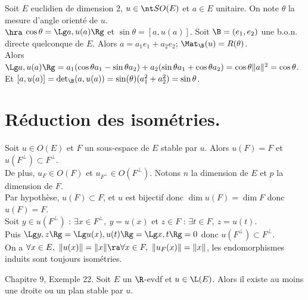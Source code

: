 \documentclass[11pt]{article}
\begin{document}
\begin{ex}{}{}
    Soit $E$ euclidien de dimension 2, $u\in\SO(E)$ et $a\in E$ unitaire. On note $\theta$ la mesure d'angle orienté de $u$.\\
    $\hra$ $\cos\theta=\Lg a, u(a) \Rg$ et $\sin\theta=[a, u(a)]$.
    \tcblower
    Soit $\B=(e_1,e_2)$ une b.o.n. directe quelconque de $E$. Alors $a=a_1e_1+a_2e_2$; $\Mat_\B(u)=R(\theta)$.\\
    Alors $\Lg a, u(a) \Rg  = a_1(\cos\theta a_1 - \sin\theta a_2) + a_2(\sin\theta a_1 + \cos\theta a_2) = \cos\theta\|a\|^2=\cos\theta$.\\
    Et $[a,u(a)]=\det_\B(a,u(a))=\sin(\theta)(a_1^2+a_2^2)=\sin\theta$.
\end{ex}

\section{Réduction des isométries.}

\begin{prop}{}{}
    Soit $u\in O(E)$ et $F$ un sous-espace de $E$ stable par $u$. Alors $u(F) = F$ et $u(F^\bot)\subset F^\bot$.\\
    De plus, $u_F\in O(F)$ et $u_{F^\bot}\in O(F^\bot)$.
    \tcblower
    Notons $n$ la dimension de $E$ et $p$ la dimension de $F$.\\
    Par hypothèse, $u(F)\subset F$, et $u$ est bijectif donc $\dim u(F) = \dim F$ donc $u(F)=F$.\\
    Soit $y\in u(F^\bot)$ : $\exists x \in F^\bot, ~ y=u(x)$ et $z\in F$ : $\exists t \in F, ~ z=u(t)$.\\
    Puis $\Lg y, z \Rg = \Lg u(x), u(t) \Rg = \Lg x,t\Rg = 0$ donc $u(F^\bot)\subset F^\bot$.\\
    On a $\forall x \in E, ~ \|u(x)\|=\|x\| \ra \forall x \in F, ~ \|u_F(x)\|=\|x\|$, les endomorphismes induits sont toujours isométries.
\end{prop}

\vspace*{-0.5cm}

\begin{rappel}{Chapitre 9, Exemple 22.}{}
    Soit $E$ un $\R$-evdf et $u\in\L(E)$. Alors il existe au moins une droite ou un plan stable par $u$.
\end{rappel}

\vspace*{-0.5cm}
\end{document}
